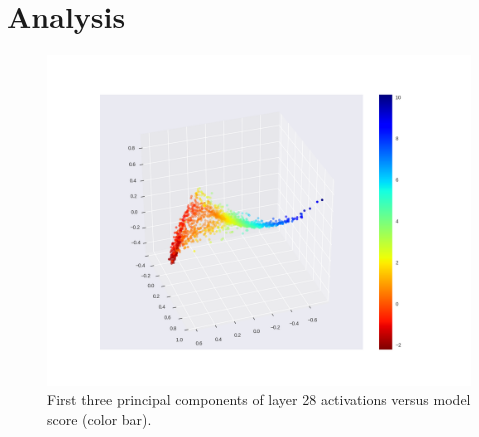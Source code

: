 \documentclass[letter,10pt]{article}
\begin{document}
\section{Analysis}

\begin{figure}[H]
    \centering
    \includegraphics[width=\linewidth]{Fig/CASP11Stage1_SCWRL_activations_pca.png}
    \caption{First three principal components of layer 28 activations versus model score (color bar).}
    \label{Fig:PCA}
\end{figure}



{}

\end{document}
